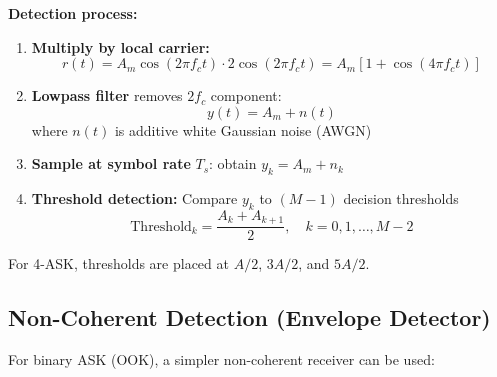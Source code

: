 \textbf{Detection process:}
\begin{enumerate}
\item \textbf{Multiply by local carrier:}
\begin{equation}
r(t) = A_m \cos(2\pi f_c t) \cdot 2\cos(2\pi f_c t) = A_m[1 + \cos(4\pi f_c t)]
\end{equation}

\item \textbf{Lowpass filter} removes $2f_c$ component:
\begin{equation}
y(t) = A_m + n(t)
\end{equation}
where $n(t)$ is additive white Gaussian noise (AWGN)

\item \textbf{Sample at symbol rate} $T_s$: obtain $y_k = A_m + n_k$

\item \textbf{Threshold detection:} Compare $y_k$ to $(M-1)$ decision thresholds
\begin{equation}
\text{Threshold}_k = \frac{A_k + A_{k+1}}{2}, \quad k = 0, 1, \ldots, M-2
\end{equation}
\end{enumerate}

For 4-ASK, thresholds are placed at $A/2$, $3A/2$, and $5A/2$.

\subsection{Non-Coherent Detection (Envelope Detector)}

For binary ASK (OOK), a simpler non-coherent receiver can be used:

\begin{center}
\end{center}


